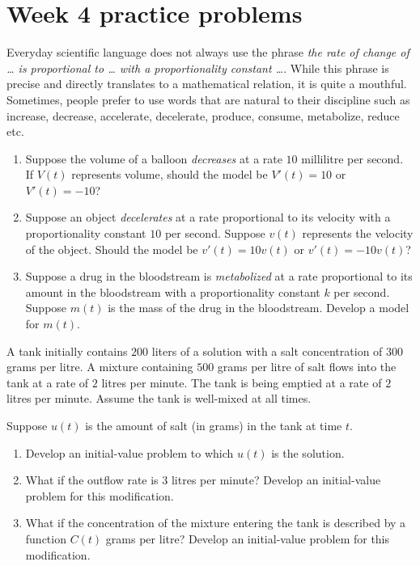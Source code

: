 \documentclass[../main.tex]{subfiles}
\begin{document}
\section{Week 4 practice problems}

\begin{exercise}
  Everyday scientific language does not always use the phrase \emph{the rate of change of \ldots{} is proportional to \ldots{} with a proportionality constant \ldots{}}. While this phrase is precise and directly translates to a mathematical relation, it is quite a mouthful. Sometimes, people prefer to use words that are natural to their discipline such as increase, decrease, accelerate, decelerate, produce, consume, metabolize, reduce etc.

  \begin{enumerate}
    \item Suppose the volume of a balloon \emph{decreases} at a rate \(10\) millilitre per second. If \(V(t)\) represents volume, should the model be \(V'(t) = 10\) or \(V'(t) = -10\)?
    \item Suppose an object \emph{decelerates} at a rate proportional to its velocity with a proportionality constant \(10\) per second. Suppose \(v(t)\) represents the velocity of the object. Should the model be \(v'(t) = 10 v(t)\) or \(v'(t) = -10 v(t)\)?
    \item Suppose a drug in the bloodstream is \emph{metabolized} at a rate proportional to its amount in the bloodstream with a proportionality constant \(k\) per second. Suppose \(m(t)\) is the mass of the drug in the bloodstream.  Develop a model for \(m(t)\).
  \end{enumerate}
\end{exercise}

\begin{exercise}
  A tank initially contains \(200\) liters of a solution with a salt concentration of \(300\) grams per litre.  A mixture containing \(500\) grams per litre of salt flows into the tank at a rate of \(2\) litres per minute. The tank is being emptied at a rate of \(2\) litres per minute. Assume the tank is well-mixed at all times. 

  Suppose \(u(t)\) is the amount of salt (in grams) in the tank at time \(t\). 

  \begin{enumerate}
    \item Develop an initial-value problem to which \(u(t)\) is the solution.
    \item What if the outflow rate is \(3\) litres per minute? Develop an initial-value problem for this modification.
    \item What if the concentration of the mixture entering the tank is described by a function \(C(t)\) grams per litre? Develop an initial-value problem for this modification.
  \end{enumerate}
\end{exercise}
\end{document}
